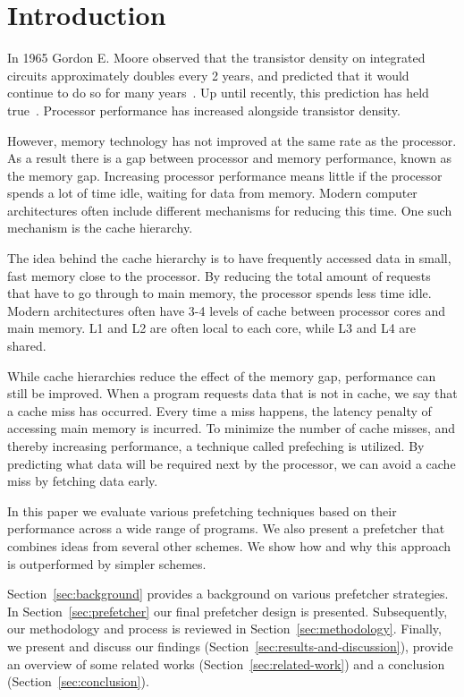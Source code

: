 \section{Introduction}
\label{sec:introduction}

In 1965 Gordon E. Moore observed that the transistor density on integrated circuits approximately doubles every 2 years,
and predicted that it would continue to do so for many years~\cite{bib:moore}.
Up until recently, this prediction has held true~\cite{bib:moore-slowdown}.
Processor performance has increased alongside transistor density.

However, memory technology has not improved at the same rate as the processor.
As a result there is a gap between processor and memory performance, known as the memory gap.
Increasing processor performance means little if the processor spends a lot of time idle, waiting for data from memory.
Modern computer architectures often include different mechanisms for reducing this time.
One such mechanism is the cache hierarchy.

The idea behind the cache hierarchy is to have frequently accessed data in small, fast memory close to the processor.
By reducing the total amount of requests that have to go through to main memory, the processor spends less time idle.
Modern architectures often have 3-4 levels of cache between processor cores and main memory.
L1 and L2 are often local to each core, while L3 and L4 are shared.

While cache hierarchies reduce the effect of the memory gap, performance can still be improved.
When a program requests data that is not in cache, we say that a cache miss has occurred.
Every time a miss happens, the latency penalty of accessing main memory is incurred.
To minimize the number of cache misses, and thereby increasing performance, a technique called prefeching is utilized.
By predicting what data will be required next by the processor, we can avoid a cache miss by fetching data early.

In this paper we evaluate various prefetching techniques based on their performance across a wide range of programs.
We also present a prefetcher that combines ideas from several other schemes.
We show how and why this approach is outperformed by simpler schemes.

Section~\ref{sec:background} provides a background on various prefetcher strategies.
In Section~\ref{sec:prefetcher} our final prefetcher design is presented.
Subsequently, our methodology and process is reviewed in Section~\ref{sec:methodology}.
Finally, we present and discuss our findings (Section~\ref{sec:results-and-discussion}), provide an overview of some related works (Section~\ref{sec:related-work}) and a conclusion (Section~\ref{sec:conclusion}).


